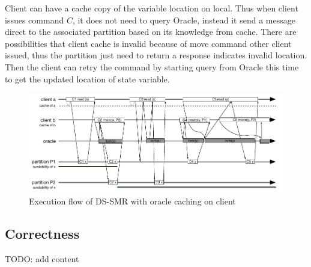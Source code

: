 Client can have a cache copy of the variable location on local. Thus when client issues command $C$, it does not need to query Oracle, instead it send a message direct to the associated partition based on its knowledge from cache. There are possibilities that client cache is invalid because of move command other client issued, thus the partition just need to return a response indicates invalid location. Then the client can retry the command by starting query from Oracle this time to get the updated location of state variable. 

\begin{figure}
\begin{minipage}[b]{1\linewidth} %
\centering
      \includegraphics[width=0.85\linewidth]{figures/cache}
\end{minipage}
\caption{Execution flow of DS-SMR with oracle caching on client}
\label{fig:cache}
\end{figure}

\subsection{Correctness}
\label{sec:correctness}
TODO: add content